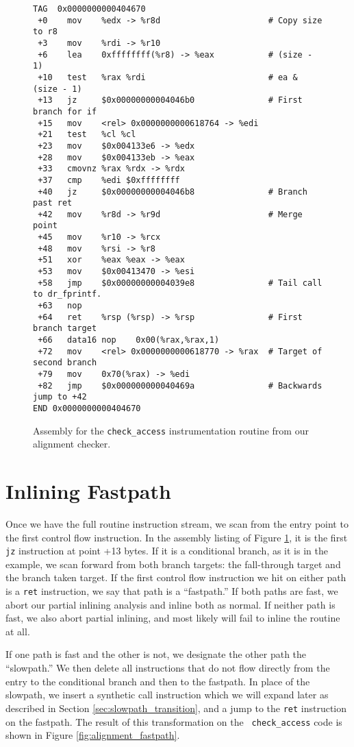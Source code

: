 \begin{figure}
\begin{verbatim}
TAG  0x0000000000404670
 +0    mov    %edx -> %r8d                      # Copy size to r8
 +3    mov    %rdi -> %r10
 +6    lea    0xffffffff(%r8) -> %eax           # (size - 1)
 +10   test   %rax %rdi                         # ea & (size - 1)
 +13   jz     $0x00000000004046b0               # First branch for if
 +15   mov    <rel> 0x0000000000618764 -> %edi
 +21   test   %cl %cl
 +23   mov    $0x004133e6 -> %edx
 +28   mov    $0x004133eb -> %eax
 +33   cmovnz %rax %rdx -> %rdx
 +37   cmp    %edi $0xffffffff
 +40   jz     $0x00000000004046b8               # Branch past ret
 +42   mov    %r8d -> %r9d                      # Merge point
 +45   mov    %r10 -> %rcx
 +48   mov    %rsi -> %r8
 +51   xor    %eax %eax -> %eax
 +53   mov    $0x00413470 -> %esi
 +58   jmp    $0x00000000004039e8               # Tail call to dr_fprintf.
 +63   nop
 +64   ret    %rsp (%rsp) -> %rsp               # First branch target
 +66   data16 nop    0x00(%rax,%rax,1)
 +72   mov    <rel> 0x0000000000618770 -> %rax  # Target of second branch
 +79   mov    0x70(%rax) -> %edi
 +82   jmp    $0x000000000040469a               # Backwards jump to +42
END 0x0000000000404670
\end{verbatim}
\caption{Assembly for the {\tt check\_access} instrumentation routine from our
alignment checker.}
\label{fig:alignment_asm}
\end{figure}

\section{Inlining Fastpath}
\label{sec:inlining_fastpath}

Once we have the full routine instruction stream, we scan from the entry point
to the first control flow instruction.  In the assembly listing of Figure
\ref{fig:alignment_asm}, it is the first {\tt jz} instruction at point +13
bytes.  If it is a conditional branch, as it is in the example, we scan forward
from both branch targets: the fall-through target and the branch taken target.
If the first control flow instruction we hit on either path is a {\tt ret}
instruction, we say that path is a ``fastpath.''  If both paths are fast, we
abort our partial inlining analysis and inline both as normal.  If neither path
is fast, we also abort partial inlining, and most likely will fail to inline the
routine at all.

If one path is fast and the other is not, we designate the other path the
``slowpath.''  We then delete all instructions that do not flow directly from
the entry to the conditional branch and then to the fastpath.  In place of the
slowpath, we insert a synthetic call instruction which we will expand later as
described in Section \ref{sec:slowpath_transition}, and a jump to the {\tt ret}
instruction on the fastpath.  The result of this transformation on the {\tt
check\_access} code is shown in Figure \ref{fig:alignment_fastpath}.

